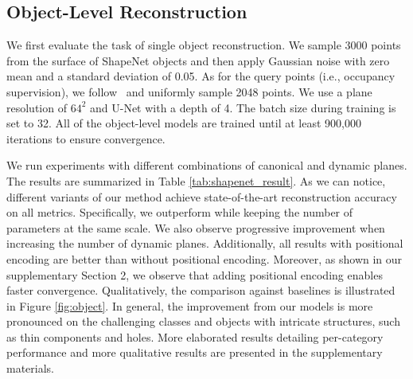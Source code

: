 \documentclass[10pt,twocolumn,letterpaper]{article}
\begin{document}
\subsection{Object-Level Reconstruction}

We first evaluate the task of single object reconstruction.
We sample 3000 points from the surface of ShapeNet objects and then apply Gaussian noise with zero mean and a standard deviation of 0.05. 
As for the query points (i.e., occupancy supervision), we follow~\cite{peng2020convolutional} and uniformly sample 2048 points. 
We use a plane resolution of $64^2$ and U-Net with a depth of 4.
The batch size during training is set to 32. 
All of the object-level models are trained until at least 900,000 iterations to ensure convergence.

We run experiments with different combinations of canonical and dynamic planes. The results are summarized in Table \ref{tab:shapenet_result}. As we can notice, different variants of our method achieve state-of-the-art reconstruction accuracy on all metrics. Specifically, we outperform \cite{peng2020convolutional} while keeping the number of parameters at the same scale. We also observe progressive improvement when increasing the number of dynamic planes. Additionally, all results with positional encoding are better than without positional encoding. Moreover, as shown in our supplementary Section 2, we observe that adding positional encoding enables faster convergence. Qualitatively, the comparison against baselines is illustrated in Figure \ref{fig:object}. In general, the improvement from our models is more pronounced on the challenging classes and objects with intricate structures, such as thin components and holes. More elaborated results detailing per-category performance and more qualitative results are presented in the supplementary materials. 
\end{document}
